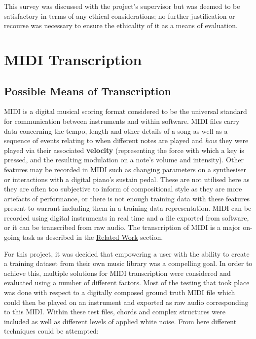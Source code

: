 \documentclass[12pt,]{article}
\begin{document}
This survey was discussed with the project's supervisor but was deemed
to be satisfactory in terms of any ethical considerations; no further
justification or recourse was necessary to ensure the ethicality of it
as a means of evaluation.

\hypertarget{midi-transcription}{%
\section{MIDI Transcription}\label{midi-transcription}}

\hypertarget{possible-means-of-transcription}{%
\subsection{Possible Means of
Transcription}\label{possible-means-of-transcription}}

MIDI is a digital musical scoring format considered to be the universal
standard for communication between instruments and within software. MIDI
files carry data concerning the tempo, length and other details of a
song as well as a sequence of events relating to when different notes
are played and \emph{how} they were played via their associated
\textbf{velocity} (representing the force with which a key is pressed,
and the resulting modulation on a note's volume and intensity). Other
features may be recorded in MIDI such as changing parameters on a
synthesiser or interactions with a digital piano's sustain pedal. These
are not utilised here as they are often too subjective to inform of
compositional style as they are more artefacts of performance, or there
is not enough training data with these features present to warrant
including them in a training data representation. MIDI can be recorded
using digital instruments in real time and a file exported from
software, or it can be transcribed from raw audio. The transcription of
MIDI is a major on-going task as described in the
\protect\hyperlink{relatedwork}{Related Work} section.

For this project, it was decided that empowering a user with the ability
to create a training dataset from their own music library was a
compelling goal. In order to achieve this, multiple solutions for MIDI
transcription were considered and evaluated using a number of different
factors. Most of the testing that took place was done with respect to a
digitally composed ground truth MIDI file which could then be played on
an instrument and exported as raw audio corresponding to this MIDI.
Within these test files, chords and complex structures were included as
well as different levels of applied white noise. From here different
techniques could be attempted:
\end{document}

